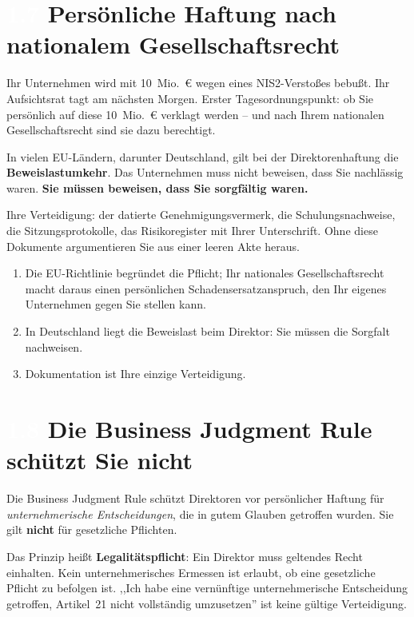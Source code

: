 \documentclass[11pt,a4paper,twoside]{book}
\newcommand{\lessontag}[1]{%
  \texorpdfstring{%
    \setlength{\fboxsep}{3pt}\colorbox{nisd2blue}{\textcolor{white}{\footnotesize\bfseries #1}}\quad%
  }{Lektion #1\ }%
}
\begin{document}
\section{\lessontag{1.7}Persönliche Haftung nach nationalem Gesellschaftsrecht}

Ihr Unternehmen wird mit 10~Mio.~\euro{} wegen eines NIS2-Verstoßes bebußt. Ihr Aufsichtsrat tagt am nächsten Morgen. Erster Tagesordnungspunkt: ob Sie persönlich auf diese 10~Mio.~\euro{} verklagt werden -- und nach Ihrem nationalen Gesellschaftsrecht sind sie dazu berechtigt.

\begin{warningbox}
In vielen EU-Ländern, darunter Deutschland, gilt bei der Direktorenhaftung die \textbf{Beweislastumkehr}. Das Unternehmen muss nicht beweisen, dass Sie nachlässig waren. \textbf{Sie müssen beweisen, dass Sie sorgfältig waren.}

Ihre Verteidigung: der datierte Genehmigungsvermerk, die Schulungsnachweise, die Sitzungsprotokolle, das Risikoregister mit Ihrer Unterschrift. Ohne diese Dokumente argumentieren Sie aus einer leeren Akte heraus.
\end{warningbox}

\begin{keytakeaways}
\begin{enumerate}
  \item Die EU-Richtlinie begründet die Pflicht; Ihr nationales Gesellschaftsrecht macht daraus einen persönlichen Schadensersatzanspruch, den Ihr eigenes Unternehmen gegen Sie stellen kann.
  \item In Deutschland liegt die Beweislast beim Direktor: Sie müssen die Sorgfalt nachweisen.
  \item Dokumentation ist Ihre einzige Verteidigung.
\end{enumerate}
\end{keytakeaways}

\section{\lessontag{1.8}Die Business Judgment Rule schützt Sie nicht}

Die Business Judgment Rule schützt Direktoren vor persönlicher Haftung für \emph{unternehmerische Entscheidungen}, die in gutem Glauben getroffen wurden. Sie gilt \textbf{nicht} für gesetzliche Pflichten.

Das Prinzip heißt \textbf{Legalitätspflicht}: Ein Direktor muss geltendes Recht einhalten. Kein unternehmerisches Ermessen ist erlaubt, ob eine gesetzliche Pflicht zu befolgen ist. ,,Ich habe eine vernünftige unternehmerische Entscheidung getroffen, Artikel~21 nicht vollständig umzusetzen'' ist keine gültige Verteidigung.
\end{document}
